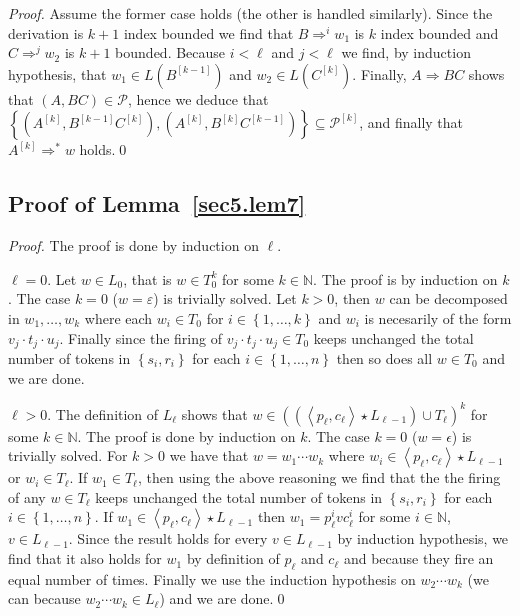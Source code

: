 \documentclass{fsttcs}
\def\set#1{{\left\{ #1 \right\}}}
\def\tuple#1{{\left\langle #1 \right\rangle}}
\def\nats{{\mathbb{N}}}
\def\prod{\mathcal{P}}
\begin{document}
\begin{proof}
Assume the former case holds (the other is handled similarly).  Since the
derivation is \(k+1\) index bounded we find that \(B\Rightarrow^i w_1\) is
\(k\) index bounded and \(C\Rightarrow^{j} w_2\) is \(k+1\) bounded.  Because
\(i<\ell\) and \(j<\ell\) we find, by induction hypothesis, that \(w_1\in L(B^{[k-1]})\) and \(w_2\in L(C^{[k]})\).
Finally, \(A\Rightarrow BC\) shows that \( (A,BC)\in\prod \), 
hence we deduce that \( \set{(A^{[k]}, B^{[k-1]}C^{[k]}),(A^{[k]},
B^{[k]}C^{[k-1]})}\subseteq \prod^{[k]}\), and finally that \(A^{[k]}\Rightarrow^* w\) holds.\qed
\end{proof}






\subsection{Proof of Lemma~\ref{sec5.lem7}}

\begin{proof} 
The proof is done by induction on $\ell$.

 $\ell=0$. 
Let \(w\in L_0\), that is \(w\in T_0^{k}\) for some \(k\in\nats\).
The proof is by induction on \(k\). The case \(k=0\) (\(w=\varepsilon\)) is trivially
solved. Let \(k>0\), then \(w\) can be decomposed in \(w_1,\ldots,w_k\)
where each \(w_i\in T_0\) for \(i\in\set{1,\ldots,k}\) and
\(w_i\) is necesarily of the form \(v_j \cdot t_j \cdot u_j\). 
Finally since the firing of $v_j \cdot t_j \cdot u_j\in T_0$ keeps unchanged the total number of
tokens in \(\set{s_i,r_i}\) for each \(i\in\set{1,\ldots,n}\) then
so does all \(w\in T_0\) and we are done.

 $\ell>0$.   
The definition of \(L_{\ell}\) shows that \(w\in((\tuple{p_{\ell},c_{\ell}}\star
L_{\ell-1}) \cup T_{\ell})^k\) for some \(k\in\nats\). The proof is done by
induction on \(k\). The case \(k=0\) (\(w=\epsilon\)) is trivially solved. For
\(k>0\) we have that \(w=w_1\cdots w_k\) where \(w_i\in
\tuple{p_{\ell},c_{\ell}}\star L_{\ell-1}\) or \(w_i\in T_{\ell}\).  If
\(w_1\in T_{\ell}\), then using the above reasoning we find that the the firing
of any \(w\in T_{\ell}\) keeps unchanged the total number of tokens in
\(\set{s_i,r_i}\) for each \(i\in\set{1,\ldots,n}\).  If
\(w_1\in \tuple{p_{\ell},c_{\ell}}\star L_{\ell-1}\) then \(w_1= p_{\ell}^{i} v
c_{\ell}^{i}\) for some \(i\in\nats\), \(v\in L_{\ell-1}\).
Since the result holds for every \(v\in L_{\ell-1}\) by induction hypothesis,
we find that it also holds for \(w_1\) by definition of \(p_{\ell}\) and
\(c_{\ell}\) and because they fire an equal number of times.  Finally we use
the induction hypothesis on \(w_2\cdots w_k\) (we can because \(w_2\cdots
w_k\in L_{\ell}\)) and we are done.\qed
\end{proof}
\end{document}
